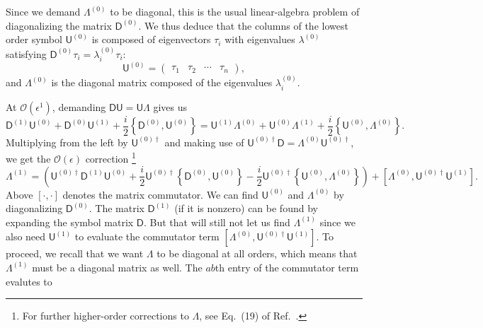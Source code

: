 %
Since we demand $\Lambda^{(0)}$ to be diagonal, this is the usual linear-algebra problem of diagonalizing the matrix $\mathsf{D}^{(0)}$.
We thus deduce that the columns of the lowest order symbol $\mathsf{U}^{(0)}$ is composed of eigenvectors $\tau_{i}$ with eigenvalues $\lambda^{(0)}$ satisfying $\mathsf{D}^{(0)}\tau_{i} = \lambda^{(0)}_{i}\tau_{i}$:
%
\begin{equation}
  \mathsf{U}^{(0)} =
  \begin{pmatrix}
    \tau_{1} & \tau_{2} & \cdots & \tau_{n}
  \end{pmatrix},
\end{equation}
%
and $\Lambda^{(0)}$ is the diagonal matrix composed of the eigenvalues $\lambda_{i}^{(0)}$.

At $\mathcal{O}(\epsilon^{1})$, demanding $\mathsf{D}\mathsf{U} = \mathsf{U}\Lambda$ gives us
%
\begin{equation}
\mathsf{D}^{(1)}\mathsf{U}^{(0)} + \mathsf{D}^{(0)}\mathsf{U}^{(1)} + \frac{i}{2}\left\{\mathsf{D}^{(0)}, \mathsf{U}^{(0)}\right\} =
  \mathsf{U}^{(1)}\Lambda^{(0)} + \mathsf{U}^{(0)}\Lambda^{(1)} + \frac{i}{2}\left\{\mathsf{U}^{(0)}, \Lambda^{(0)}\right\}.
\end{equation}
%
Multiplying from the left by $\mathsf{U}^{(0)\dagger}$ and making use of $\mathsf{U}^{(0)\dagger}\mathsf{D} = \Lambda^{(0)}\mathsf{U}^{(0)\dagger}$, we get the $\mathcal{O}(\epsilon)$ correction%
\footnote{For further higher-order corrections to $\Lambda$, see Eq.~(19) of Ref.~\cite{weigert1993}.}
%
\begin{equation}
  \Lambda^{(1)} = \left(\mathsf{U}^{(0)\dagger}\mathsf{D}^{(1)}\mathsf{U}^{(0)} +
  \frac{i}{2}\mathsf{U}^{(0)\dagger}\left\{\mathsf{D}^{(0)},\mathsf{U}^{(0)}\right\} - \frac{i}{2}\mathsf{U}^{(0)\dagger}\left\{\mathsf{U}^{(0)},\Lambda^{(0)}\right\}\right) + \left[\Lambda^{(0)},\mathsf{U}^{(0)\dagger}\mathsf{U}^{(1)}\right].
  \label{eq:Lambda1}
\end{equation}
%
Above $[\cdot,\cdot]$ denotes the matrix commutator.
We can find $\mathsf{U}^{(0)}$ and $\Lambda^{(0)}$ by diagonalizing $\mathsf{D}^{(0)}$.
The matrix $\mathsf{D}^{(1)}$ (if it is nonzero) can be found by expanding the symbol matrix $\mathsf{D}$.
But that will still not let us find $\Lambda^{(1)}$ since we also need $\mathsf{U}^{(1)}$ to evaluate the commutator term $[\Lambda^{(0)},\mathsf{U}^{(0)\dagger}\mathsf{U}^{(1)}]$.
To proceed, we recall that we want $\Lambda$ to be diagonal at all orders, which means that $\Lambda^{(1)}$ must be a diagonal matrix as well.
The $ab$th entry of the commutator term evalutes to
